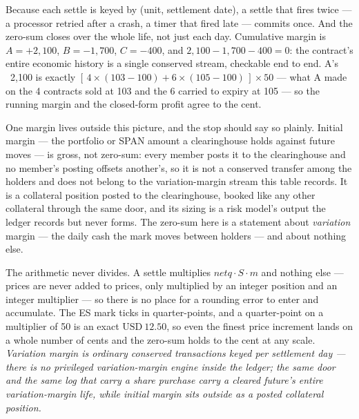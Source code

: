 Because each settle is keyed by (unit, settlement date), a settle that fires twice ---
a processor retried after a crash, a timer that fired late --- commits once. And the
zero-sum closes over the whole life, not just each day. Cumulative margin is
$A = +2{,}100$, $B = -1{,}700$, $C = -400$, and $2{,}100 - 1{,}700 - 400 = 0$: the
contract's entire economic history is a single conserved stream, checkable end to end.
A's ~2{,}100 is exactly $[\,4 \times (103 - 100) + 6 \times (105 - 100)\,]
\times 50$ --- what A made on the 4 contracts sold at 103 and the 6 carried to expiry
at 105 --- so the running margin and the closed-form profit agree to the cent.

One margin lives outside this picture, and the stop should say so plainly. Initial
margin --- the portfolio or SPAN amount a clearinghouse holds against future moves ---
is gross, not zero-sum: every member posts it to the clearinghouse and no member's
posting offsets another's, so it is not a conserved transfer among the holders and does
not belong to the variation-margin stream this table records. It is a collateral
position posted to the clearinghouse, booked like any other collateral through the same
door, and its sizing is a risk model's output the ledger records but never forms. The
zero-sum here is a statement about \emph{variation} margin --- the daily cash the mark
moves between holders --- and about nothing else.

The arithmetic never divides. A settle multiplies $\mathit{netq} \cdot S \cdot m$ and
nothing else --- prices are never added to prices, only multiplied by an integer
position and an integer multiplier --- so there is no place for a rounding error to
enter and accumulate. The ES mark ticks in quarter-points, and a quarter-point on a
multiplier of 50 is an exact $\text{USD}~12.50$, so even the finest price increment
lands on a whole number of cents and the zero-sum holds to the cent at any scale.
\emph{Variation margin is ordinary conserved transactions keyed per settlement day ---
there is no privileged \emph{variation-margin} engine inside the ledger; the same door
and the same log that carry a share purchase carry a cleared future's entire
variation-margin life, while initial margin sits outside as a posted collateral
position.}
